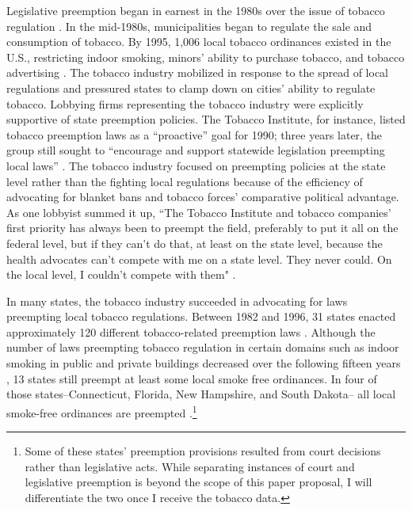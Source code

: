 \documentclass[12pt]{article}
\begin{document}
Legislative preemption began in earnest in the 1980s over the issue of tobacco regulation \parencite{hicksHomeRuleBe2018,riverstone-newellRiseStatePreemption2017,nationalcancerinstituteStateLocalLegislative2000}. In the mid-1980s, municipalities began to regulate the sale and consumption of tobacco. By 1995, 1,006 local tobacco ordinances existed in the U.S., restricting indoor smoking, minors' ability to purchase tobacco, and tobacco advertising \parencite{siegelPreemptionTobaccoControl1997}. The tobacco industry mobilized in response to the spread of local regulations and pressured states to clamp down on cities' ability to regulate tobacco. Lobbying firms representing the tobacco industry were explicitly supportive of state preemption policies. The Tobacco Institute, for instance, listed tobacco preemption laws as a ``proactive'' goal for 1990; three years later, the group still sought to ``encourage and support statewide legislation preempting local laws'' \parencite[Quoted in][]{centersfordiseasecontrolPreemptiveStateTobaccoControl1999,nationalcancerinstituteStateLocalLegislative2000}. The tobacco industry focused on preempting policies at the state level rather than the fighting local regulations because of the efficiency of advocating for blanket bans and tobacco forces' comparative political advantage. As one lobbyist summed it up, ``The Tobacco Institute and tobacco companies' first priority has always been to preempt the field, preferably to put it all on the federal level, but if they can't do that, at least on the state level, because the health advocates can't compete with me on a state level. They never could. On the local level, I couldn't compete with them" \parencite{skolnickCancerConvertsTobacco1995}.

In many states, the tobacco industry succeeded in advocating for laws preempting local tobacco regulations. Between 1982 and 1996, 31 states enacted approximately 120 different tobacco-related preemption laws \parencite{centersfordiseasecontrolPreemptiveStateTobaccoControl1999}. Although the number of laws preempting tobacco regulation in certain domains such as indoor smoking in public and private buildings decreased over the following fifteen years \cite{centersfordiseasecontrolStatePreemptionLocal2010}, 13 states still preempt at least some local smoke free ordinances. In four of those states--Connecticut, Florida, New Hampshire, and South Dakota-- all local smoke-free ordinances are preempted \parencite{centersfordiseasecontrolStatePreemptionLocal2010}.\footnote{Some of these states' preemption provisions resulted from court decisions rather than legislative acts. While separating instances of court and legislative preemption is beyond the scope of this paper proposal, I will differentiate the two once I receive the tobacco data.}
\end{document}
